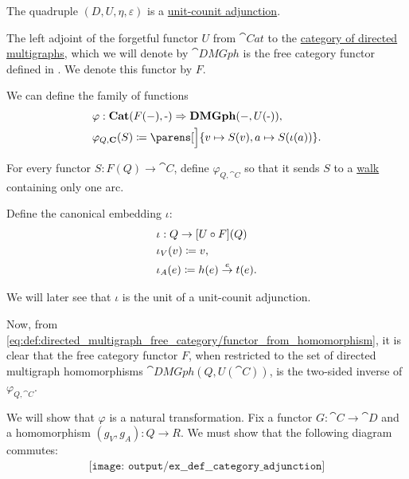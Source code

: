 \begin{example}
\begin{thmenum}
    The quadruple \( (D, U, \eta, \varepsilon) \) is a \hyperref[def:category_adjunction/unit_counit]{unit-counit adjunction}.

     The left adjoint of the forgetful functor \( U \) from \( \cat{Cat} \) to the \hyperref[def:directed_multigraph/category]{category of directed multigraphs}, which we will denote by \( \cat{DMGph} \) is the free category functor defined in . We denote this functor by \( F \).

    We can define the family of functions
    \begin{equation}\label{eq:ex:def:category_adjunction/dm_cat/varphi_family}
      \begin{aligned}
        &\varphi: \cat{Cat}(F(\anon*), \cat{\anon*}) \Rightarrow \cat{DMGph}(\anon*, U(\cat{\anon*})), \\
        &\varphi_{Q, \cat{C}}(S) \coloneqq \parens[\Big]{ v \mapsto S(v), a \mapsto S(\iota(a)) }.
      \end{aligned}
    \end{equation}

    For every functor \( S: F(Q) \to \cat{C} \), define \( \varphi_{Q, \cat{C}} \) so that it sends \( S \) to a \hyperref[def:graph_walk/directed]{walk} containing only one arc.

    Define the canonical embedding \( \iota \):
    \begin{equation*}
      \begin{aligned}
        &\iota: Q \to [U \bincirc F](Q) \\
        &\iota_V(v) \coloneqq v, \\
        &\iota_A(e) \coloneqq h(e) \overset e \to t(e).
      \end{aligned}
    \end{equation*}

    We will later see that \( \iota \) is the unit of a unit-counit adjunction.

    Now, from \eqref{eq:def:directed_multigraph_free_category/functor_from_homomorphism}, it is clear that the free category functor \( F \), when restricted to the set of directed multigraph homomorphisms \( \cat{DMGph}(Q, U(\cat{C})) \), is the two-sided inverse of \( \varphi_{Q, \cat{C}} \).

    We will show that \( \varphi \) is a natural transformation. Fix a functor \( G: \cat{C} \to \cat{D} \) and a homomorphism \( (g_V, g_A): Q \to R \). We must show that the following diagram commutes:
    \begin{equation}\label{eq:ex:def:category_adjunction/dm_cat/varphi_nat}
      \begin{aligned}
        \texttt{[image: output/ex\_\_def\_\_category\_adjunction]}
      \end{aligned}
    \end{equation}


\end{thmenum}
\end{example}
